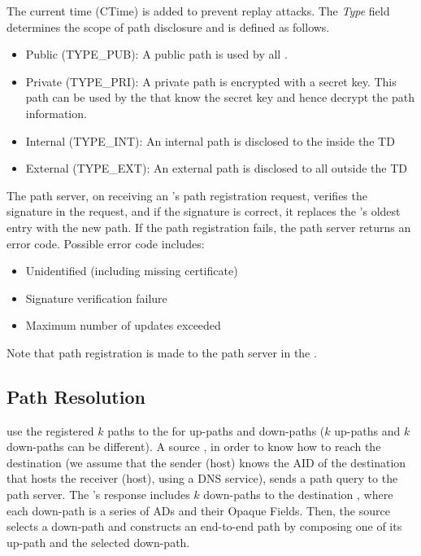 \noindent The current time (CTime) is added to prevent replay attacks. The {\em Type} field determines the scope of path disclosure and is defined as follows. %
\begin{itemize}
\item {Public (TYPE\_PUB): } A public path is used by all \ADs. %
\item {Private (TYPE\_PRI): } A private path is encrypted with a secret key. This path can be used by the \ADs that know the secret key and hence decrypt the path information. %
\item {Internal (TYPE\_INT): } An internal path is disclosed to the \ADs inside the TD %
\item {External (TYPE\_EXT): } An external path is disclosed to all \ADs outside the TD %
\end{itemize}

The \TDC path server, on receiving an \AD's path registration request, verifies the signature in the request, and if the signature is correct, it replaces the \AD's oldest entry with the new path. If the path registration fails, the path server returns an error code. Possible error code includes:

\begin{itemize}
\item Unidentified \AD (including missing \AD certificate)
\item Signature verification failure
\item Maximum number of updates exceeded
\end{itemize}

Note that path registration is made to the path server in the \TDC.

\subsection{Path Resolution} 
\STUB \ADs use the registered $k$ paths to the \TDC for up-paths and down-paths ($k$ up-paths and $k$ down-paths can be different). A source \AD, in order to know how to reach the destination \AD (we assume that the sender (host) knows the AID of the destination \AD that hosts the receiver (host), using a DNS service), sends a path query to the \TDC path server. The \TDC \PS's response includes $k$ down-paths to the destination \AD, where each down-path is a series of ADs and their Opaque Fields. Then, the source \AD selects a down-path and constructs an end-to-end path by composing one of its up-path and the selected down-path.

